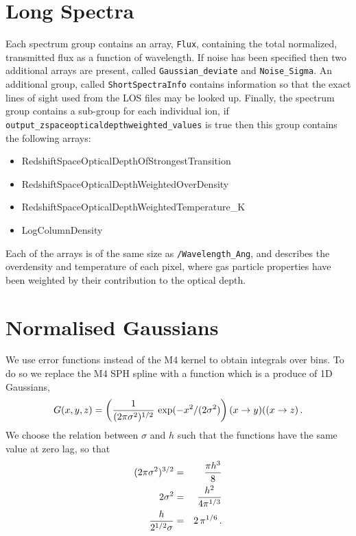 \documentclass{report}
\begin{document}
\section{Long Spectra}

Each spectrum group contains an array, {\tt Flux}, containing the total normalized, transmitted flux as a function of wavelength.  If noise has been specified then two additional arrays are present, called {\tt Gaussian\_deviate} and {\tt Noise\_Sigma}.  An additional group, called {\tt ShortSpectraInfo} contains information so that the exact lines of sight used from the LOS files may be looked up.  Finally, the spectrum group contains a sub-group for each individual ion, if {\tt output\_zspaceopticaldepthweighted\_values} is true then this group contains the following arrays:

\begin{itemize}
\item RedshiftSpaceOpticalDepthOfStrongestTransition
\item RedshiftSpaceOpticalDepthWeightedOverDensity
\item RedshiftSpaceOpticalDepthWeightedTemperature\_K
\item LogColumnDensity
\end{itemize}

Each of the arrays is of the same size as {\tt /Wavelength\_Ang}, and describes the overdensity and temperature of each pixel, where gas particle properties have been weighted by their contribution to the optical depth.

\section{Normalised Gaussians}
We use error functions instead of the M4 kernel to obtain integrals over bins. To do so we replace the M4 SPH spline with a function which is a produce of 1D Gaussians,
\begin{equation}
G(x,y,z) = \left({1\over (2\pi \sigma^2)^{1/2}}\,\exp(-x^2/(2\sigma^2)\right)(x\rightarrow y)((x\rightarrow z)\,.
\end{equation}
We choose the relation between $\sigma$ and $h$ such that the functions have the same value at zero lag, so that
\begin{eqnarray}
(2\pi\sigma^2)^{3/2} &=& {\pi h^3\over 8}\nonumber\\
2\sigma^2 &=& {h^2\over 4 \pi^{1/3}}\nonumber\\
{h\over 2^{1/2}\sigma} &=& 2\,\pi^{1/6}\,.
\end{eqnarray}
\end{document}
